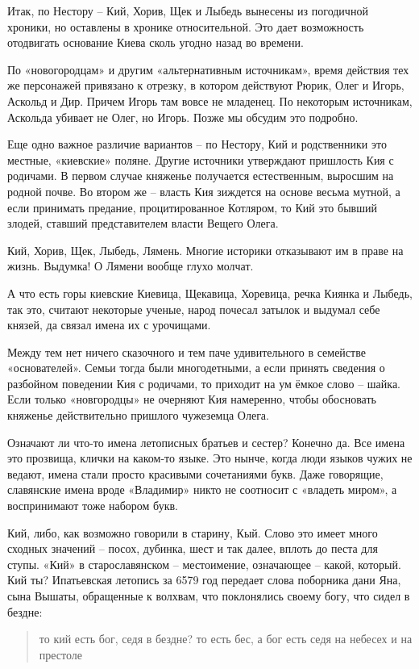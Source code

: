 Итак, по Нестору – Кий, Хорив, Щек и Лыбедь вынесены из погодичной хроники, но оставлены в хронике относительной. Это дает возможность отодвигать основание Киева сколь угодно назад во времени.

По «новогородцам» и другим «альтернативным источникам», время действия тех же персонажей привязано к отрезку, в котором действуют Рюрик, Олег и Игорь, Аскольд и Дир. Причем Игорь там вовсе не младенец. По некоторым источникам, Аскольда убивает не Олег, но Игорь. Позже мы обсудим это подробно.

Еще одно важное различие вариантов – по Нестору, Кий и родственники это местные, «киевские» поляне. Другие источники утверждают пришлость Кия с родичами. В первом случае княженье получается естественным, выросшим на родной почве. Во втором же – власть Кия зиждется на основе весьма мутной, а если принимать предание, процитированное Котляром, то Кий это бывший злодей, ставший представителем власти Вещего Олега.

Кий, Хорив, Щек, Лыбедь, Лямень. Многие историки отказывают им в праве на жизнь. Выдумка! О Лямени вообще глухо молчат.  

А что есть горы киевские Киевица, Щекавица, Хоревица, речка Киянка и Лыбедь, так это, считают некоторые ученые, народ почесал затылок и выдумал себе князей, да связал имена их с урочищами.

Между тем нет ничего сказочного и тем паче удивительного в семействе «основателей». Семьи тогда были многодетными, а если принять сведения о разбойном поведении Кия с родичами, то приходит на ум ёмкое слово – шайка. Если только «новгородцы» не очерняют Кия намеренно, чтобы обосновать княженье действительно пришлого чужеземца Олега.

Означают ли что-то имена летописных братьев и сестер? Конечно да. Все имена это прозвища, клички на каком-то языке. Это нынче, когда люди языков чужих не ведают, имена стали просто красивыми сочетаниями букв. Даже говорящие, славянские имена вроде «Владимир» никто не соотносит с «владеть миром», а воспринимают тоже набором букв.

Кий, либо, как возможно говорили в старину, Кый. Слово это имеет много сходных значений – посох, дубинка, шест и так далее, вплоть до песта для ступы. «Кий» в старославянском – местоимение, означающее – какой, который. Кий ты? Ипатьевская летопись за 6579 год передает слова поборника дани Яна, сына Вышаты, обращенные к волхвам, что поклонялись своему богу, что сидел в бездне:

\begin{quotation}
то кий есть бог, седя в бездне? то есть бес, а бог есть седя на небесех и на престоле
\end{quotation}

